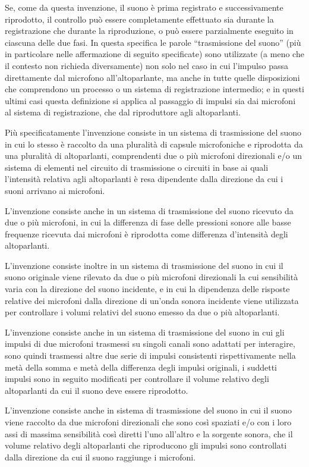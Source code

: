 \documentclass[11pt]{article}
\begin{document}
\begin{multicols*}{2}
Se, come da questa invenzione, il suono è prima registrato e successivamente riprodotto, il controllo può essere completamente effettuato sia durante la registrazione che durante la riproduzione, o può essere parzialmente eseguito in ciascuna  delle due fasi. In questa specifica le parole “trasmissione del suono” (più in particolare nelle affermazione di seguito specificate) sono utilizzate (a meno che il contesto non richieda diversamente) non solo nel caso in cui l’impulso passa direttamente dal microfono all’altoparlante, ma anche in tutte quelle disposizioni che comprendono un processo o un sistema di registrazione intermedio; e in questi ultimi casi questa definizione si applica al passaggio di impulsi sia dai microfoni al sistema di registrazione, che dal riproduttore agli altoparlanti.

Più specificatamente l’invenzione consiste in un sistema di trasmissione del suono in cui lo stesso è raccolto da una pluralità di capsule microfoniche e riprodotta da una pluralità di altoparlanti, comprendenti due o più microfoni direzionali e/o un sistema di elementi nel circuito di trasmissione o circuiti in base ai quali l’intensità relativa agli altoparlanti è resa dipendente dalla direzione da cui i suoni arrivano ai microfoni.

L’invenzione consiste anche in un sistema di trasmissione del suono ricevuto da due o più microfoni, in cui la differenza di fase delle pressioni sonore alle basse frequenze ricevuta dai microfoni è riprodotta come differenza d’intensità degli altoparlanti.

L’invenzione consiste inoltre in un sistema di trasmissione del suono in cui il suono originale viene rilevato da due o più microfoni direzionali la cui sensibilità varia con la direzione del suono incidente, e in cui la dipendenza delle risposte relative dei microfoni dalla direzione di un’onda sonora incidente viene utilizzata per controllare i volumi relativi del suono emesso da due o più altoparlanti.

L’invenzione consiste anche in un sistema di trasmissione del suono in cui gli impulsi di due microfoni trasmessi su singoli canali sono adattati per interagire, sono quindi trasmessi altre due serie di impulsi consistenti rispettivamente nella metà della somma e metà della differenza degli impulsi originali, i suddetti impulsi sono in seguito modificati per controllare il volume relativo degli altoparlanti da cui il suono deve essere riprodotto. 

L’invenzione consiste anche in sistema di trasmissione del suono in cui il suono viene raccolto da due microfoni direzionali che sono così spaziati e/o con i loro assi di massima sensibilità così diretti l’uno all’altro e la sorgente sonora, che il volume relativo degli altoparlanti che riproducono gli impulsi sono controllati dalla direzione da cui il suono raggiunge i microfoni.


\end{multicols*}
\end{document}
